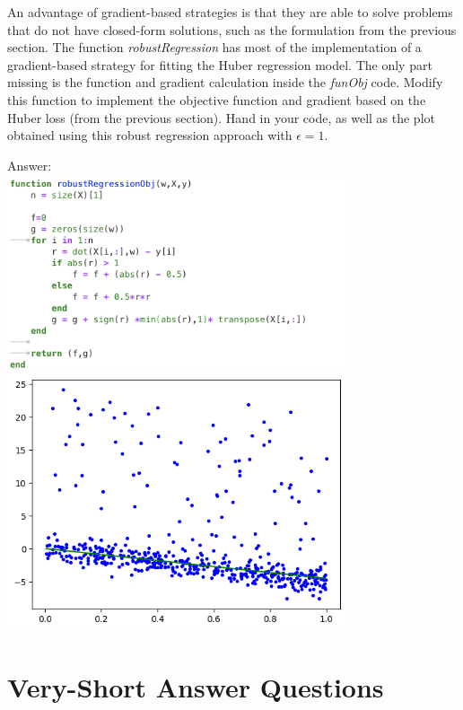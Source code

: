 \documentclass{article}
\def\ans#1{\par\gre{Answer: #1}}
\def\blu#1{{\color{blu}#1}}
\def\gre#1{{\color{gre}#1}}
\def\red#1{{\color{red}#1}}
\begin{document}
An advantage of gradient-based strategies is that they are able to solve problems that do not have closed-form solutions, such as the formulation from the previous section. The function \emph{robustRegression} has most of the implementation of a gradient-based strategy for fitting the Huber regression model. The only part missing is the function and gradient calculation inside the \emph{funObj} code. \blu{Modify this function to implement the objective function and gradient based on the Huber loss (from the previous section). Hand in your code, as well as the plot obtained using this robust regression approach \red{with $\epsilon = 1$}.}

\ans{\\
\includegraphics[width = 10cm]{Q43.png}\\ 
\includegraphics[width=10cm]{Q43Code.png}}
\section{Very-Short Answer Questions}
\end{document}
